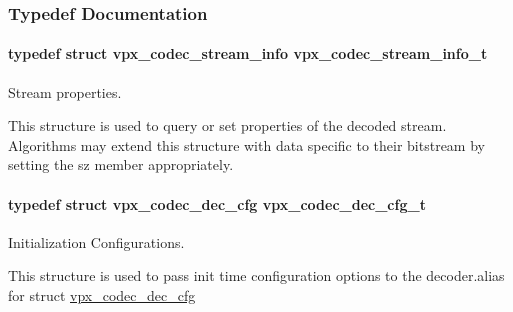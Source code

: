 \subsubsection{Typedef Documentation}
\hypertarget{group__decoder_ga900420e8f7cb9c1b3070b2ba7d636974}{
\paragraph[{vpx\+\_\+codec\+\_\+stream\+\_\+info\+\_\+t}]{\setlength{\rightskip}{0pt plus 5cm}typedef struct {\bf vpx\+\_\+codec\+\_\+stream\+\_\+info}  {\bf vpx\+\_\+codec\+\_\+stream\+\_\+info\+\_\+t}}}\label{group__decoder_ga900420e8f7cb9c1b3070b2ba7d636974}


Stream properties. 

This structure is used to query or set properties of the decoded stream. Algorithms may extend this structure with data specific to their bitstream by setting the sz member appropriately. \hypertarget{group__decoder_ga4a2e808eb43f1e798024b5a409c484f9}{
\paragraph[{vpx\+\_\+codec\+\_\+dec\+\_\+cfg\+\_\+t}]{\setlength{\rightskip}{0pt plus 5cm}typedef struct {\bf vpx\+\_\+codec\+\_\+dec\+\_\+cfg}  {\bf vpx\+\_\+codec\+\_\+dec\+\_\+cfg\+\_\+t}}}\label{group__decoder_ga4a2e808eb43f1e798024b5a409c484f9}


Initialization Configurations. 

This structure is used to pass init time configuration options to the decoder.\+alias for struct \hyperlink{structvpx__codec__dec__cfg}{vpx\+\_\+codec\+\_\+dec\+\_\+cfg} 

